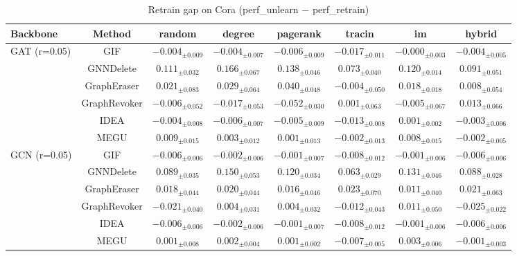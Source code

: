 \begin{table}[t]
\centering\small
\setlength{\tabcolsep}{4pt}
\caption{Retrain gap on Cora (perf\_unlearn $-$ perf\_retrain)}
\label{tab:phaseB-gap-cora}
\begin{tabular}{lccccccc}
\toprule
Backbone & Method & random & degree & pagerank & tracin & im & hybrid \\
\midrule
\multirow{6}{*}{GAT (r=0.05)} & GIF & $-0.004_{\pm 0.009}$ & $-0.004_{\pm 0.007}$ & $-0.006_{\pm 0.009}$ & $-0.017_{\pm 0.011}$ & $-0.000_{\pm 0.003}$ & $-0.004_{\pm 0.005}$ \\
 & GNNDelete & $0.111_{\pm 0.032}$ & $0.166_{\pm 0.067}$ & $0.138_{\pm 0.046}$ & $0.073_{\pm 0.040}$ & $0.120_{\pm 0.014}$ & $0.091_{\pm 0.051}$ \\
 & GraphEraser & $0.021_{\pm 0.083}$ & $0.029_{\pm 0.064}$ & $0.040_{\pm 0.048}$ & $-0.004_{\pm 0.050}$ & $0.018_{\pm 0.018}$ & $0.008_{\pm 0.054}$ \\
 & GraphRevoker & $-0.006_{\pm 0.052}$ & $-0.017_{\pm 0.053}$ & $-0.052_{\pm 0.030}$ & $0.001_{\pm 0.063}$ & $-0.005_{\pm 0.067}$ & $0.013_{\pm 0.066}$ \\
 & IDEA & $-0.004_{\pm 0.008}$ & $-0.006_{\pm 0.007}$ & $-0.005_{\pm 0.009}$ & $-0.013_{\pm 0.008}$ & $0.001_{\pm 0.002}$ & $-0.003_{\pm 0.006}$ \\
 & MEGU & $0.009_{\pm 0.015}$ & $0.003_{\pm 0.012}$ & $0.001_{\pm 0.013}$ & $-0.002_{\pm 0.013}$ & $0.008_{\pm 0.015}$ & $-0.002_{\pm 0.005}$ \\
\midrule
\multirow{6}{*}{GCN (r=0.05)} & GIF & $-0.006_{\pm 0.006}$ & $-0.002_{\pm 0.006}$ & $-0.001_{\pm 0.007}$ & $-0.008_{\pm 0.012}$ & $-0.001_{\pm 0.006}$ & $-0.006_{\pm 0.006}$ \\
 & GNNDelete & $0.089_{\pm 0.035}$ & $0.150_{\pm 0.053}$ & $0.120_{\pm 0.034}$ & $0.063_{\pm 0.029}$ & $0.131_{\pm 0.046}$ & $0.088_{\pm 0.028}$ \\
 & GraphEraser & $0.018_{\pm 0.044}$ & $0.020_{\pm 0.044}$ & $0.016_{\pm 0.046}$ & $0.023_{\pm 0.070}$ & $0.011_{\pm 0.040}$ & $0.021_{\pm 0.063}$ \\
 & GraphRevoker & $-0.021_{\pm 0.040}$ & $0.004_{\pm 0.031}$ & $0.004_{\pm 0.032}$ & $-0.012_{\pm 0.043}$ & $0.011_{\pm 0.050}$ & $-0.025_{\pm 0.022}$ \\
 & IDEA & $-0.006_{\pm 0.006}$ & $-0.002_{\pm 0.006}$ & $-0.001_{\pm 0.007}$ & $-0.008_{\pm 0.012}$ & $-0.001_{\pm 0.006}$ & $-0.006_{\pm 0.006}$ \\
 & MEGU & $0.001_{\pm 0.008}$ & $0.002_{\pm 0.004}$ & $0.001_{\pm 0.002}$ & $-0.007_{\pm 0.005}$ & $0.003_{\pm 0.006}$ & $-0.001_{\pm 0.003}$ \\
\bottomrule
\end{tabular}
\end{table}

